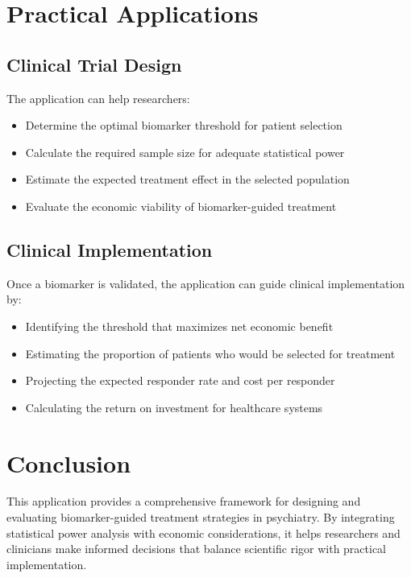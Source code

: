 \documentclass{article}
\begin{document}
\section{Practical Applications}

\subsection{Clinical Trial Design}

The application can help researchers:

\begin{itemize}
    \item Determine the optimal biomarker threshold for patient selection
    \item Calculate the required sample size for adequate statistical power
    \item Estimate the expected treatment effect in the selected population
    \item Evaluate the economic viability of biomarker-guided treatment
\end{itemize}

\subsection{Clinical Implementation}

Once a biomarker is validated, the application can guide clinical implementation by:

\begin{itemize}
    \item Identifying the threshold that maximizes net economic benefit
    \item Estimating the proportion of patients who would be selected for treatment
    \item Projecting the expected responder rate and cost per responder
    \item Calculating the return on investment for healthcare systems
\end{itemize}

\section{Conclusion}

This application provides a comprehensive framework for designing and evaluating biomarker-guided treatment strategies in psychiatry. By integrating statistical power analysis with economic considerations, it helps researchers and clinicians make informed decisions that balance scientific rigor with practical implementation.
\end{document}
